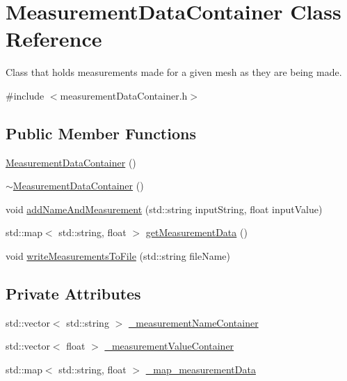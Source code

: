 \hypertarget{classMeasurementDataContainer}{\section{Measurement\-Data\-Container Class Reference}
\label{classMeasurementDataContainer}
}


Class that holds measurements made for a given mesh as they are being made.  




{\ttfamily \#include $<$measurement\-Data\-Container.\-h$>$}

\subsection*{Public Member Functions}
\begin{DoxyCompactItemize}
\item 
\hyperlink{classMeasurementDataContainer_ad5c4b7326d7182d810044b417c063d49}{Measurement\-Data\-Container} ()
\item 
\hyperlink{classMeasurementDataContainer_a284e16b430bf27e9f47b2911d12bfcbc}{$\sim$\-Measurement\-Data\-Container} ()
\item 
void \hyperlink{classMeasurementDataContainer_ae188cde8f036724dc0b2399d92b2ef97}{add\-Name\-And\-Measurement} (std\-::string input\-String, float input\-Value)
\item 
std\-::map$<$ std\-::string, float $>$ \hyperlink{classMeasurementDataContainer_a6e18bce3080595ca2276f452cbd460ce}{get\-Measurement\-Data} ()
\item 
void \hyperlink{classMeasurementDataContainer_a73c657aa08420738d78cc46db36d26f4}{write\-Measurements\-To\-File} (std\-::string file\-Name)
\end{DoxyCompactItemize}
\subsection*{Private Attributes}
\begin{DoxyCompactItemize}
\item 
std\-::vector$<$ std\-::string $>$ \hyperlink{classMeasurementDataContainer_aedf6dcab70e753e2ceb7f20a58ae3112}{\-\_\-measurement\-Name\-Container}
\item 
std\-::vector$<$ float $>$ \hyperlink{classMeasurementDataContainer_a2795d51b1daf461af38923e1fdc4c444}{\-\_\-measurement\-Value\-Container}
\item 
std\-::map$<$ std\-::string, float $>$ \hyperlink{classMeasurementDataContainer_afd620c2a3da101266e5738d5a64235b5}{\-\_\-map\-\_\-measurement\-Data}
\end{DoxyCompactItemize}


